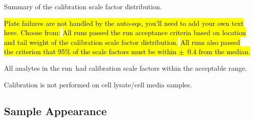 \documentclass[11pt]{article}
\newif\ifshowSampleNotes  %
\newif\ifCalFails      %
\newcommand{\Plural}{}
\newcommand{\NumCalFail}{\hl{X}}
\begin{document}
\begin{table}[ht!]
  \begin{center}
    
    \caption{Summary of the calibration scale factor distribution\Plural.}
    \label{tab:calSOP}
  \end{center}
\end{table}

  \hl{Plate failures are not handled by the auto-sqs, you'll need to add your
      own text here. Choose from:}
  \hl{All runs passed the run acceptance criteria based on location and tail
      weight of the calibration scale factor distribution.}
  \hl{All runs also passed the criterion that 95\% of the scale factors must be
      within $\pm$~0.4 from the median.}

\ifCalFails

There \NumCalFail~that had calibration scale factors in the tails of the
distribution\Plural~(Table \ref{tab:caltail}).  Results based on analyte with
calibration scale factors outside the acceptance criteria should be treated
with caution.  Sensitivity analysis is recommended.
  

  \begin{table}[ht!]
    \begin{center}
      
      \caption{Analytes with calibration scale factors in the tails of the
        distribution\Plural.}
      \label{tab:caltail}
    \end{center}
  \end{table}

\else
All analytes in the run\Plural~had calibration scale factors within the
acceptable range.
\fi

\else  %
Calibration is not performed on cell lysate/cell media samples.
\fi    %




\ifshowSampleNotes
\newpage
\fi
\subsection{Sample Appearance} \label{sec:appear}

\ifshowSampleNotes
\end{document}
